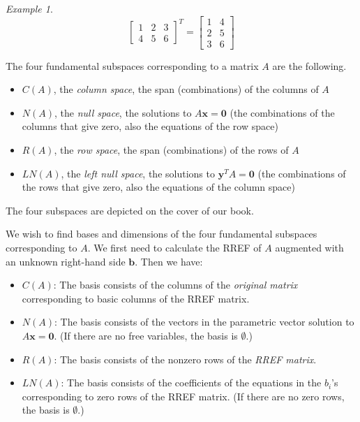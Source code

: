 \documentclass[11pt,oneside]{amsbook}
\theoremstyle{definition}
\theoremstyle{plain}
\theoremstyle{definition}
\theoremstyle{remark}
\newtheorem{example}[theorem]{Example}
\numberwithin{equation}{section}
\numberwithin{figure}{section}
\begin{document}
\begin{example}
  \[\begin{bmatrix}1&2&3\\4&5&6\end{bmatrix}^T
    =\begin{bmatrix}1&4\\2&5\\3&6\end{bmatrix}
  \]
\end{example}

The four fundamental subspaces corresponding to a matrix $A$ are the following.
\begin{itemize}
  \item $C(A)$, the \emph{column space}, the span (combinations) of the columns of $A$
  \item $N(A)$, the \emph{null space}, the solutions to $A\mathbf{x}=\mathbf{0}$ (the combinations of the columns that give zero, also the equations of the row space)
  \item $R(A)$, the \emph{row space}, the span (combinations) of the rows of $A$
  \item $LN(A)$, the \emph{left null space}, the solutions to $\mathbf{y}^TA=\mathbf{0}$ (the combinations of the rows that give zero, also the equations of the column space)
\end{itemize}

The four subspaces are depicted on the cover of our book.

We wish to find bases and dimensions of the four fundamental subspaces corresponding to $A$. We first need to calculate the RREF of $A$ augmented with an unknown right-hand side $\mathbf{b}$. Then we have:

\begin{itemize}
  \item $C(A)$: The basis consists of the columns of the \emph{original matrix} corresponding to basic columns of the RREF matrix.
  \item $N(A)$: The basis consists of the vectors in the parametric vector solution to $A\mathbf{x}=\mathbf{0}$. (If there are no free variables, the basis is $\emptyset$.)
  \item $R(A)$: The basis consists of the nonzero rows of the \emph{RREF matrix}.
  \item $LN(A)$: The basis consists of the coefficients of the equations in the $b_i$'s corresponding to zero rows of the RREF matrix. (If there are no zero rows, the basis is $\emptyset$.)
\end{itemize}
\end{document}
